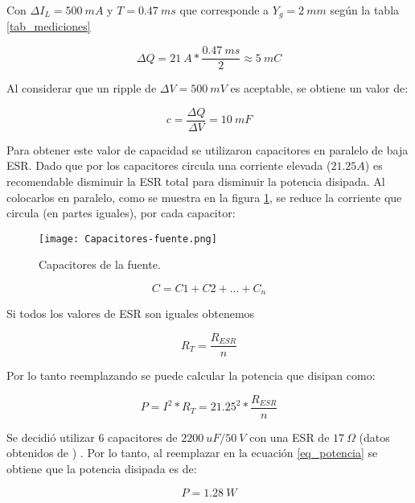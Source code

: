 \noindent Con $\Delta I_L=500 \:mA$ y $T=0.47\:ms$ que corresponde a $Y_g = 2 \:mm$ según la tabla \ref{tab_mediciones}

\begin{equation} 
\Delta Q = 21\:A * \frac{0.47\:ms}{2} \approx 5\:mC
\end{equation}

\noindent Al considerar que un ripple de $\Delta V=500 \:mV$ es aceptable, se obtiene un valor de:

\begin{equation} 
	c = \frac{\Delta Q}{\Delta V} = 10 \:mF
\end{equation}

\noindent Para obtener este valor de capacidad se utilizaron capacitores en paralelo de baja ESR. Dado que por los capacitores circula una corriente elevada ($21.25 A$) es recomendable disminuir la ESR total para disminuir la potencia disipada. Al colocarlos en paralelo, como se muestra en la figura \ref{fig:img_capacitores-fuente}, se reduce la corriente que circula (en partes iguales), por cada capacitor:


\begin{figure}[H]
	\centering
	\texttt{[image: Capacitores-fuente.png]}
	\caption{Capacitores de la fuente.}
	\label{fig:img_capacitores-fuente}
\end{figure}


\begin{equation} 
	C = C1 + C2 + ... + C_n
\end{equation}


\noindent Si todos los valores de ESR son iguales obtenemos

\begin{equation} 
R_T = \frac{R_{ESR}}{n}
\end{equation}

\noindent Por lo tanto reemplazando se puede calcular la potencia que disipan como:

\begin{equation}\label{eq_potencia} 
	P = I^2 * R_T = 21.25^2 * \frac{R_{ESR}}{n}
\end{equation}

\noindent Se decidió utilizar 6 capacitores  de $2200 \:uF/50\:V$ con una ESR de $17 \:\Omega$ (datos obtenidos de \cite{EKY-350ELL222MM25S}) . Por lo tanto, al reemplazar en la ecuación \ref{eq_potencia} se obtiene que la potencia disipada es de: 

\begin{equation} 
	P=1.28\:W
\end{equation}


